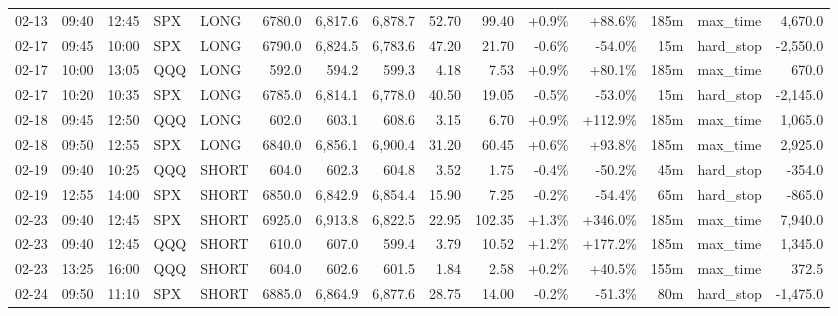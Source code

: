 \documentclass[11pt,a4paper,twoside]{article}
\begin{document}
\begin{landscape}
\begin{center}
\begin{longtable}{>{\color{txtmain}}l l l l l r r r r r r r r >{\color{txtmain}}l r}
02-13 & 09:40 & 12:45 & SPX & LONG & 6780.0 & 6,817.6 & 6,878.7 & 52.70 & 99.40 & \textcolor{wingreen}{+0.9\%} & \textcolor{wingreen}{+88.6\%} & 185m & max\_time & \textcolor{wingreen}{4,670.0} \\
02-17 & 09:45 & 10:00 & SPX & LONG & 6790.0 & 6,824.5 & 6,783.6 & 47.20 & 21.70 & \textcolor{lossred}{-0.6\%} & \textcolor{lossred}{-54.0\%} & 15m & hard\_stop & \textcolor{lossred}{-2,550.0} \\
02-17 & 10:00 & 13:05 & QQQ & LONG & 592.0 & 594.2 & 599.3 & 4.18 & 7.53 & \textcolor{wingreen}{+0.9\%} & \textcolor{wingreen}{+80.1\%} & 185m & max\_time & \textcolor{wingreen}{670.0} \\
02-17 & 10:20 & 10:35 & SPX & LONG & 6785.0 & 6,814.1 & 6,778.0 & 40.50 & 19.05 & \textcolor{lossred}{-0.5\%} & \textcolor{lossred}{-53.0\%} & 15m & hard\_stop & \textcolor{lossred}{-2,145.0} \\
02-18 & 09:45 & 12:50 & QQQ & LONG & 602.0 & 603.1 & 608.6 & 3.15 & 6.70 & \textcolor{wingreen}{+0.9\%} & \textcolor{wingreen}{+112.9\%} & 185m & max\_time & \textcolor{wingreen}{1,065.0} \\
02-18 & 09:50 & 12:55 & SPX & LONG & 6840.0 & 6,856.1 & 6,900.4 & 31.20 & 60.45 & \textcolor{wingreen}{+0.6\%} & \textcolor{wingreen}{+93.8\%} & 185m & max\_time & \textcolor{wingreen}{2,925.0} \\
02-19 & 09:40 & 10:25 & QQQ & SHORT & 604.0 & 602.3 & 604.8 & 3.52 & 1.75 & \textcolor{lossred}{-0.4\%} & \textcolor{lossred}{-50.2\%} & 45m & hard\_stop & \textcolor{lossred}{-354.0} \\
02-19 & 12:55 & 14:00 & SPX & SHORT & 6850.0 & 6,842.9 & 6,854.4 & 15.90 & 7.25 & \textcolor{lossred}{-0.2\%} & \textcolor{lossred}{-54.4\%} & 65m & hard\_stop & \textcolor{lossred}{-865.0} \\
02-23 & 09:40 & 12:45 & SPX & SHORT & 6925.0 & 6,913.8 & 6,822.5 & 22.95 & 102.35 & \textcolor{wingreen}{+1.3\%} & \textcolor{wingreen}{+346.0\%} & 185m & max\_time & \textcolor{wingreen}{7,940.0} \\
02-23 & 09:40 & 12:45 & QQQ & SHORT & 610.0 & 607.0 & 599.4 & 3.79 & 10.52 & \textcolor{wingreen}{+1.2\%} & \textcolor{wingreen}{+177.2\%} & 185m & max\_time & \textcolor{wingreen}{1,345.0} \\
02-23 & 13:25 & 16:00 & QQQ & SHORT & 604.0 & 602.6 & 601.5 & 1.84 & 2.58 & \textcolor{wingreen}{+0.2\%} & \textcolor{wingreen}{+40.5\%} & 155m & max\_time & \textcolor{wingreen}{372.5} \\
02-24 & 09:50 & 11:10 & SPX & SHORT & 6885.0 & 6,864.9 & 6,877.6 & 28.75 & 14.00 & \textcolor{lossred}{-0.2\%} & \textcolor{lossred}{-51.3\%} & 80m & hard\_stop & \textcolor{lossred}{-1,475.0} \\

\end{longtable}
\end{center}
\end{landscape}
\end{document}
